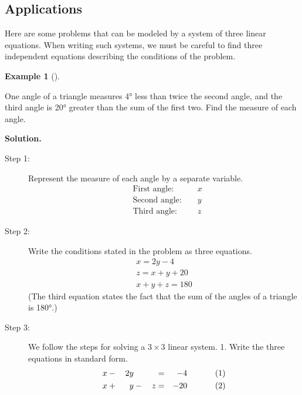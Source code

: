 \documentclass[10pt,]{book}
\theoremstyle{plain}
\theoremstyle{definition}
\theoremstyle{definition}
\newtheorem{example}[theorem]{Example}
\theoremstyle{definition}
\theoremstyle{definition}
\numberwithin{equation}{section}
\newcommand{\amp}{ & }
\begin{document}
\subsection[Applications]{Applications}\label{subsection-9}

	Here are some problems that can be modeled by a system of three linear equations. When writing such systems, we must be careful to find three independent equations describing the conditions of the problem.
%
\begin{example}[]\label{example-14}

		One angle of a triangle measures 4° less than twice the second angle, and the third angle is 20° greater than the sum of the first two. Find the measure of each angle.
\par\medskip\noindent%
\textbf{Solution.}\quad 
		\leavevmode%
\begin{description}
\item[Step 1: ]{}
				Represent the measure of each angle by a separate variable.
				\begin{align*}

						\amp\text{First angle: }\amp\amp x
					\\

						\amp\text{Second angle: }\amp\amp y
					\\

						\amp\text{Third angle:}\amp\amp z
					
\end{align*}
\item[Step 2:]{}
				Write the conditions stated in the problem as three equations.
				\begin{gather*}
x = 2y − 4\\
z = x + y + 20\\
x + y + z = 180
\end{gather*}
				(The third equation states the fact that the sum of the angles of a triangle is 180°.)
\item[Step 3:]{}
				We follow the steps for solving a \(3\times 3\) linear system.
				1. 		Write the three equations in standard form.
						\begin{alignat*}{5}

								x\amp {}-{}\amp 2y\amp {}{}\amp \amp =\amp -4\amp\hphantom{blank} \amp(1)
							\\

								x\amp {}+{}\amp y\amp {}-{}\amp z\amp =\amp -20\amp\hphantom{blank} \amp(2)
							\\


\end{alignat*}
\end{description}
\end{example}
\end{document}
